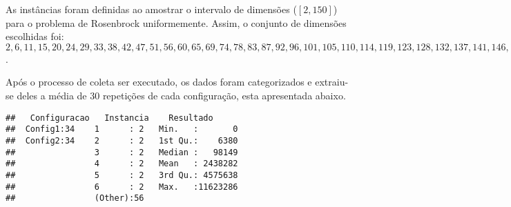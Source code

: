 \documentclass[
]{article}
\author{}
\date{\vspace{-2.5em}}
\newenvironment{Shaded}{\begin{snugshade}}{\end{snugshade}}
\newcommand{\AttributeTok}[1]{\textcolor[rgb]{0.77,0.63,0.00}{#1}}
\newcommand{\ConstantTok}[1]{\textcolor[rgb]{0.00,0.00,0.00}{#1}}
\newcommand{\ControlFlowTok}[1]{\textcolor[rgb]{0.13,0.29,0.53}{\textbf{#1}}}
\newcommand{\DecValTok}[1]{\textcolor[rgb]{0.00,0.00,0.81}{#1}}
\newcommand{\FunctionTok}[1]{\textcolor[rgb]{0.00,0.00,0.00}{#1}}
\newcommand{\NormalTok}[1]{#1}
\newcommand{\OtherTok}[1]{\textcolor[rgb]{0.56,0.35,0.01}{#1}}
\newcommand{\SpecialCharTok}[1]{\textcolor[rgb]{0.00,0.00,0.00}{#1}}
\newcommand{\StringTok}[1]{\textcolor[rgb]{0.31,0.60,0.02}{#1}}
\begin{document}
As instâncias foram definidas ao amostrar o intervalo de dimensões
(\([2,150]\)) para o problema de Rosenbrock uniformemente. Assim, o
conjunto de dimensões escolhidas foi:
\({2,6,11,15,20,24,29,33,38,42,47,51,56,60,65,69,74,78,83,87,92,96,101,105,110,114,119,123,128,132,137,141,146,150}\).

Após o processo de coleta ser executado, os dados foram categorizados e
extraiu-se deles a média de 30 repetições de cada configuração, esta
apresentada abaixo.

\begin{Shaded}
\end{Shaded}

\begin{verbatim}
##   Configuracao   Instancia    Resultado       
##  Config1:34    1      : 2   Min.   :       0  
##  Config2:34    2      : 2   1st Qu.:    6380  
##                3      : 2   Median :   98149  
##                4      : 2   Mean   : 2438282  
##                5      : 2   3rd Qu.: 4575638  
##                6      : 2   Max.   :11623286  
##                (Other):56
\end{verbatim}
\end{document}
